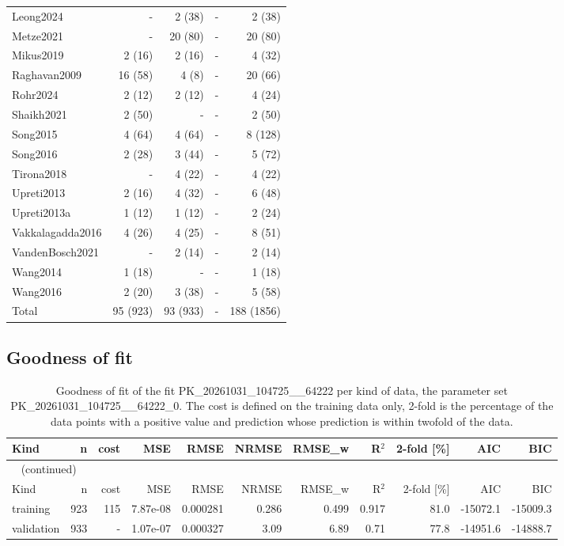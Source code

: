 \begin{longtable}{lrrrr}
Leong2024 & - & 2 (38) & - & 2 (38) \\
Metze2021 & - & 20 (80) & - & 20 (80) \\
Mikus2019 & 2 (16) & 2 (16) & - & 4 (32) \\
Raghavan2009 & 16 (58) & 4 (8) & - & 20 (66) \\
Rohr2024 & 2 (12) & 2 (12) & - & 4 (24) \\
Shaikh2021 & 2 (50) & - & - & 2 (50) \\
Song2015 & 4 (64) & 4 (64) & - & 8 (128) \\
Song2016 & 2 (28) & 3 (44) & - & 5 (72) \\
Tirona2018 & - & 4 (22) & - & 4 (22) \\
Upreti2013 & 2 (16) & 4 (32) & - & 6 (48) \\
Upreti2013a & 1 (12) & 1 (12) & - & 2 (24) \\
Vakkalagadda2016 & 4 (26) & 4 (25) & - & 8 (51) \\
VandenBosch2021 & - & 2 (14) & - & 2 (14) \\
Wang2014 & 1 (18) & - & - & 1 (18) \\
Wang2016 & 2 (20) & 3 (38) & - & 5 (58) \\
Total & 95 (923) & 93 (933) & - & 188 (1856) \\
\end{longtable}

\subsection{Goodness of fit}

\begin{longtable}{lrrrrrrrrrr}
\caption{Goodness of fit of the fit PK\_20261031\_104725\_\_64222 per kind of data, the parameter set PK\_20261031\_104725\_\_64222\_0. The cost is defined on the training data only, 2-fold is the percentage of the data points with a positive value and prediction whose prediction is within twofold of the data.}\label{tab:metrics:PK_20261031_104725__64222} \\
\toprule
Kind & n & cost & MSE & RMSE & NRMSE & RMSE\_w & R\ensuremath{^{2}} & 2-fold [\%] & AIC & BIC \\
\midrule
\endfirsthead
\multicolumn{11}{l}{\small\tablename~\thetable{} (continued)} \\
\toprule
Kind & n & cost & MSE & RMSE & NRMSE & RMSE\_w & R\ensuremath{^{2}} & 2-fold [\%] & AIC & BIC \\
\midrule
\endhead
\bottomrule
\endlastfoot
training & 923 & 115 & 7.87e-08 & 0.000281 & 0.286 & 0.499 & 0.917 & 81.0 & -15072.1 & -15009.3 \\
validation & 933 & - & 1.07e-07 & 0.000327 & 3.09 & 6.89 & 0.71 & 77.8 & -14951.6 & -14888.7 \\
\end{longtable}

